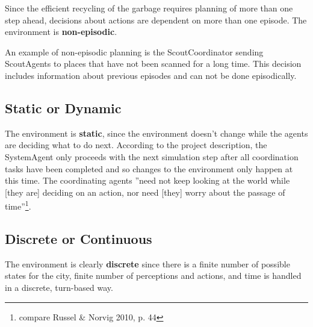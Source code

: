 Since the efficient recycling of the garbage requires planning of more than one step ahead, decisions about actions are dependent on more than one episode. The environment is \textbf{non-episodic}.

An example of non-episodic planning is the ScoutCoordinator sending ScoutAgents to places that have not been scanned for a long time. This decision includes information about previous episodes and can not be done episodically.

\subsection{Static or Dynamic}

The environment is \textbf{static}, since the environment doesn't change while the agents are deciding what to do next. According to the project description, the SystemAgent only proceeds with the next simulation step after all coordination tasks have been completed and so changes to the environment only happen at this time. The coordinating agents ''need not keep looking at the world while [they are] deciding on an action, nor need [they] worry about the passage of time''\footnote{compare Russel \& Norvig 2010, p. 44}.

\subsection{Discrete or Continuous}

The environment is clearly \textbf{discrete} since there is a finite number of possible states for the city, finite number of perceptions and actions, and time is handled in a discrete, turn-based way.
